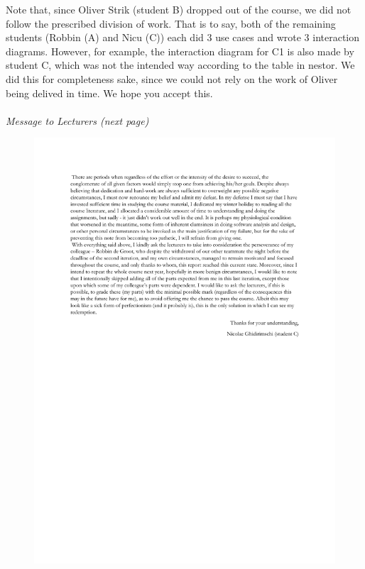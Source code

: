  Note that, since Oliver Strik (student B) dropped out of the course, we did not follow the prescribed division of work. That is to say, both of the remaining students (Robbin (A) and Nicu (C)) each did 3 use cases and wrote 3 interaction diagrams. However, for example, the interaction diagram for C1 is also made by student C, which was not the intended way according to the table in nestor. We did this for completeness sake, since we could not rely on the work of Oliver being delived in time. We hope you accept this.\\\\
 \textsl{Message to Lecturers (next page)}
 \begin{figure}[H]
 \includegraphics[scale = .8]{nicunote.pdf}
 \end{figure}
